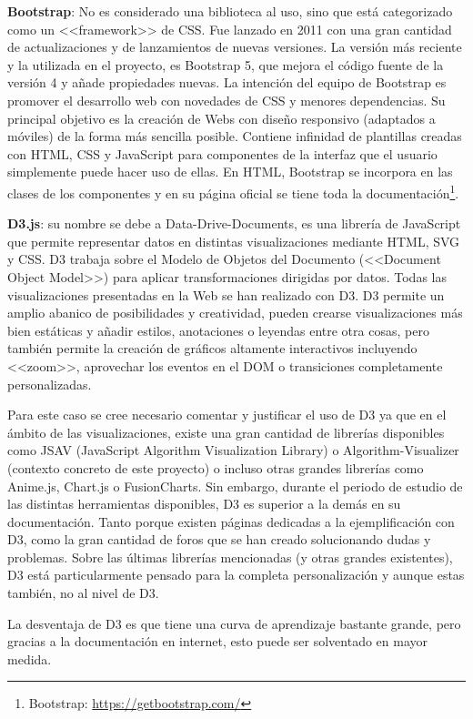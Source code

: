\textbf{Bootstrap}: No es considerado una biblioteca al uso, sino que está
categorizado como un <<framework>> de CSS. Fue lanzado en 2011 con una gran
cantidad de actualizaciones y de lanzamientos de nuevas versiones. La versión
más reciente y la utilizada en el proyecto, es Bootstrap 5, que mejora el código
fuente de la versión 4 y añade propiedades nuevas. La intención del equipo de
Bootstrap es promover el desarrollo web con novedades de CSS y menores
dependencias. Su principal objetivo es la creación de Webs con diseño responsivo
(adaptados a móviles) de la forma más sencilla posible. Contiene infinidad de
plantillas creadas con HTML, CSS y JavaScript para componentes de la interfaz
que el usuario simplemente puede hacer uso de ellas. En HTML, Bootstrap se
incorpora en las clases de los componentes y en su página oficial se tiene toda
la documentación\footnote{Bootstrap: \url{https://getbootstrap.com/}}.

\textbf{D3.js}: su nombre se debe a Data-Drive-Documents, es una librería de
JavaScript que permite representar datos en distintas visualizaciones mediante
HTML, SVG y CSS. D3 trabaja sobre el Modelo de Objetos del Documento (<<Document
Object Model>>) para aplicar transformaciones dirigidas por datos. Todas las
visualizaciones presentadas en la Web se han realizado con D3. D3 permite un
amplio abanico de posibilidades y creatividad, pueden crearse visualizaciones
más bien estáticas y añadir estilos, anotaciones o leyendas entre otra cosas,
pero también permite la creación de gráficos altamente interactivos incluyendo
<<zoom>>, aprovechar los eventos en el DOM o transiciones completamente
personalizadas.

Para este caso se cree necesario comentar y justificar el uso de D3 ya que en el
ámbito de las visualizaciones, existe una gran cantidad de librerías disponibles
como JSAV (JavaScript Algorithm Visualization Library) o Algorithm-Visualizer
(contexto concreto de este proyecto) o incluso otras grandes librerías como
Anime.js, Chart.js o FusionCharts. Sin embargo, durante el periodo de estudio de
las distintas herramientas disponibles, D3 es superior a la demás en su
documentación. Tanto porque existen páginas dedicadas a la ejemplificación con
D3, como la gran cantidad de foros que se han creado solucionando dudas y
problemas. Sobre las últimas librerías mencionadas (y otras grandes existentes),
D3 está particularmente pensado para la completa personalización y aunque estas
también, no al nivel de D3.

La desventaja de D3 es que tiene una curva de aprendizaje bastante grande, pero
gracias a la documentación en internet, esto puede ser solventado en mayor
medida.